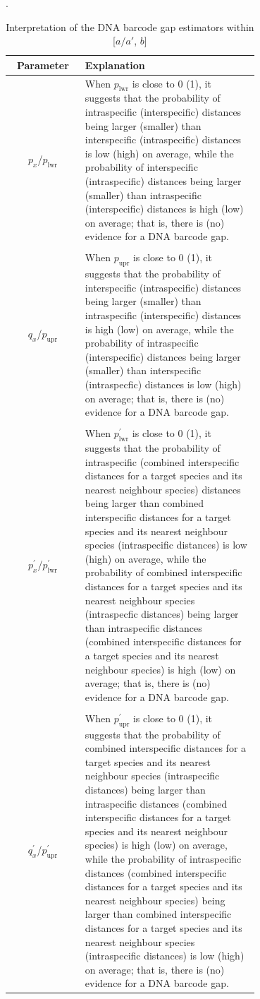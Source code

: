 \documentclass[12pt]{article}
\begin{document}
\begin{table}[htbp]
    \centering
    \small
    \caption{Interpretation of the DNA barcode gap estimators within [$a/a'$, $b$]}.
    \label{tab:parameters}
    \begin{tabular}{cp{0.7\linewidth}}
    \hline
    \textbf{Parameter} & \textbf{Explanation} \\
    \hline
    $p_x$/$p_{\text{lwr}}$ & When $p_{\text{lwr}}$ is close to 0 (1), it suggests that the probability of intraspecific (interspecific) distances being larger (smaller) than interspecific (intraspecific) distances is low (high) on average, while the probability of interspecific (intraspecific) distances being larger (smaller)  than intraspecific (interspecific) distances is high (low) on average; that is, there is (no) evidence for a DNA barcode gap.\\
        & \\[-2mm]
     $q_x$/$p_{\text{upr}}$ & When $p_{\text{upr}}$ is close to 0 (1), it suggests that the probability of interspecific (intraspecific) distances being larger (smaller) than intraspecific (interspecific) distances is high (low) on average, while the probability of intraspecific (interspecific) distances being larger (smaller) than interspecific (intraspecfic) distances is low (high) on average; that is, there is (no) evidence for a DNA barcode gap. \\
        & \\[-2mm]
    $p^{'}_x$/$p^{'}_{\text{lwr}}$ & When $p^{'}_{\text{lwr}}$ is close to 0 (1), it suggests that the probability of intraspecific (combined interspecific distances for a target species and its nearest neighbour species) distances being larger than combined interspecific distances for a target species and its nearest neighbour species (intraspecific distances) is low (high) on average, while the probability of combined interspecific distances for a target species and its nearest neighbour species (intraspecfic distances) being larger than intraspecific distances (combined interspecific distances for a target species and its nearest neighbour species) is high (low) on average; that is, there is (no) evidence for a DNA barcode gap.\\
        & \\[-2mm]
     $q^{'}_x$/$p^{'}_{\text{upr}}$ & When $p^{'}_{\text{upr}}$ is close to 0 (1), it suggests that the probability of combined interspecific distances for a target species and its nearest neighbour species (intraspecific distances) being larger than intraspecific distances (combined interspecific distances for a target species and its nearest neighbour species) is high (low) on average, while the probability of intraspecific distances (combined interspecific distances for a target species and its nearest neighbour species) being larger than combined interspecific distances for a target species and its nearest neighbour species (intraspecific distances) is low (high) on average; that is, there is (no) evidence for a DNA barcode gap.\\
    \hline
    \end{tabular}
\end{table}
\end{document}
